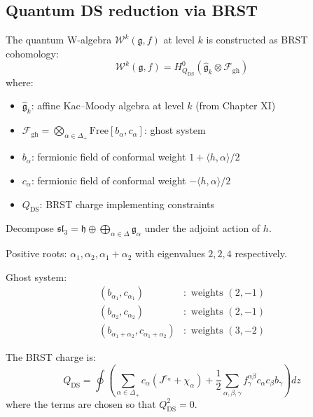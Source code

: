 \subsection{Quantum DS reduction via BRST}

\begin{definition}\label{def:quantum-ds}
The quantum W-algebra $\mathcal{W}^k(\mathfrak{g}, f)$ at level $k$ is constructed as BRST cohomology:
\begin{equation}
\mathcal{W}^k(\mathfrak{g}, f) = H^0_{Q_{\text{DS}}}\left(\widehat{\mathfrak{g}}_k \otimes \mathcal{F}_{\text{gh}}\right)
\end{equation}
where:
\begin{itemize}
\item $\widehat{\mathfrak{g}}_k$: affine Kac--Moody algebra at level $k$ (from Chapter XI)
\item $\mathcal{F}_{\text{gh}} = \bigotimes_{\alpha \in \Delta_+} \text{Free}[b_\alpha, c_\alpha]$: ghost system
\item $b_\alpha$: fermionic field of conformal weight $1 + \langle h, \alpha \rangle/2$
\item $c_\alpha$: fermionic field of conformal weight $-\langle h, \alpha \rangle/2$
\item $Q_{\text{DS}}$: BRST charge implementing constraints
\end{itemize}
\end{definition}

\begin{construction}\label{const:brst-sl3}
Decompose $\mathfrak{sl}_3 = \mathfrak{h} \oplus \bigoplus_{\alpha \in \Delta} \mathfrak{g}_\alpha$ under the adjoint action of $h$.

Positive roots: $\alpha_1, \alpha_2, \alpha_1 + \alpha_2$ with eigenvalues $2, 2, 4$ respectively.

Ghost system:
\begin{align}
(b_{\alpha_1}, c_{\alpha_1}) &: \text{ weights } (2, -1) \\
(b_{\alpha_2}, c_{\alpha_2}) &: \text{ weights } (2, -1) \\
(b_{\alpha_1+\alpha_2}, c_{\alpha_1+\alpha_2}) &: \text{ weights } (3, -2)
\end{align}

The BRST charge is:
\begin{equation}
Q_{\text{DS}} = \oint \left( \sum_{\alpha \in \Delta_+} c_\alpha (J^{e_\alpha} + \chi_\alpha) + \frac{1}{2}\sum_{\alpha,\beta,\gamma} f^{\alpha\beta}_\gamma c_\alpha c_\beta b_\gamma \right) dz
\end{equation}
where the terms are chosen so that $Q_{\text{DS}}^2 = 0$.
\end{construction}


